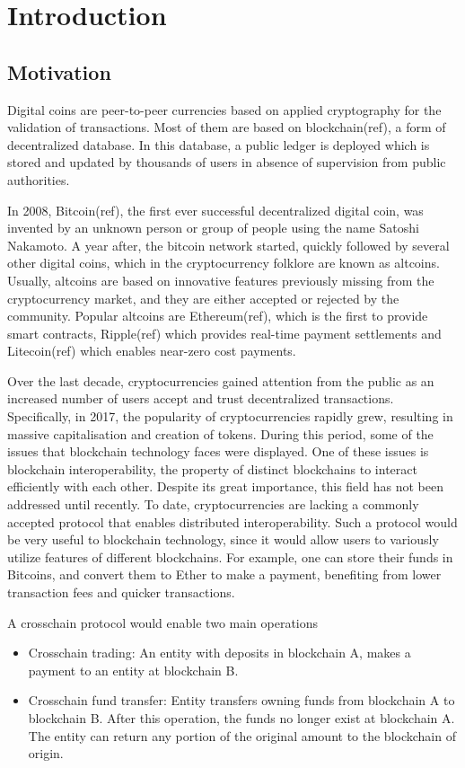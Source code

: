 \section{Introduction}

\subsection{Motivation}

Digital coins are peer-to-peer currencies based on applied cryptography
for the validation of transactions. Most of them are based on
blockchain(ref), a form of decentralized database. In this database, a
public ledger is deployed which is stored and updated by thousands of
users in absence of supervision from public authorities.

In 2008, Bitcoin(ref), the first ever successful decentralized digital
coin, was invented by an unknown person or group of people using the
name Satoshi Nakamoto. A year after, the bitcoin network started,
quickly followed by several other digital coins, which in the
cryptocurrency folklore are known as altcoins. Usually, altcoins are
based on innovative features previously missing from the cryptocurrency
market, and they are either accepted or rejected by the community.
Popular altcoins are Ethereum(ref), which is the first to provide smart
contracts, Ripple(ref) which provides real-time payment settlements and
Litecoin(ref) which enables near-zero cost payments.

Over the last decade, cryptocurrencies gained attention from the public
as an increased number of users accept and trust decentralized
transactions. Specifically, in 2017, the popularity of cryptocurrencies
rapidly grew, resulting in massive capitalisation and creation of
tokens. During this period, some of the issues that blockchain
technology faces were displayed. One of these issues is blockchain
interoperability, the property of distinct blockchains to interact
efficiently with each other. Despite its great importance, this field
has not been addressed until recently. To date, cryptocurrencies are
lacking a commonly accepted protocol that enables distributed
interoperability. Such a protocol would be very useful to blockchain
technology, since it would allow users to variously utilize features of
different blockchains. For example, one can store their funds in
Bitcoins, and convert them to Ether to make a payment, benefiting from
lower transaction fees and quicker transactions.

A crosschain protocol would enable two main operations
\begin{itemize}
    \item
        Crosschain trading: An entity with deposits in blockchain A, makes a
        payment to an entity at blockchain B.
    \item
        Crosschain fund transfer: Entity transfers owning funds from
        blockchain A to blockchain B. After this operation, the funds no
        longer exist at blockchain A. The entity can return any portion of the
        original amount to the blockchain of origin.
\end{itemize}

